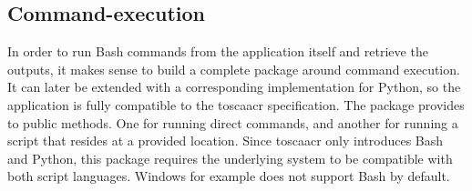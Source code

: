 
\subsection{Command-execution}
In order to run Bash commands from the application itself and retrieve the outputs, it makes sense to build a complete package around command execution. It can later be extended with a corresponding implementation for Python, so the application is fully compatible to the \gls{toscaacr} specification.
\newline
The package provides to public methods. One for running direct commands, and another for running a script that resides at a provided location.
\newline
Since \gls{toscaacr} only introduces Bash and Python, this package requires the underlying system to be compatible with both script languages. Windows for example does not support Bash by default.


